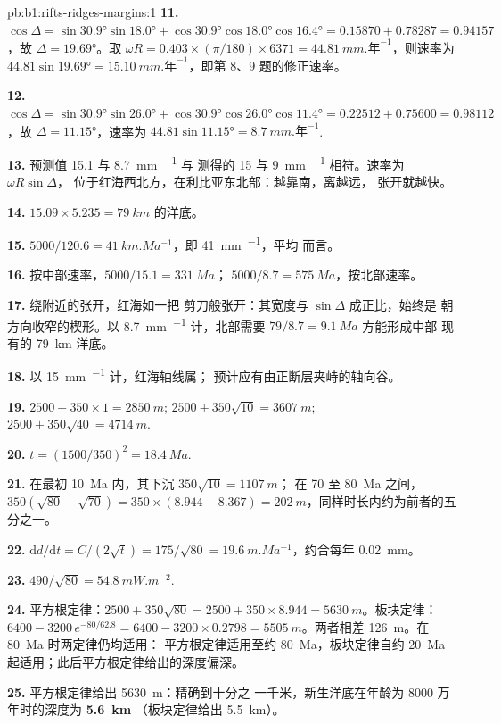 \begin{solution}{pb:b1:rifts-ridges-margins:1}
\textbf{11.} $\cos\Delta = \sin\ang{30.9}\sin\ang{18.0} +
\cos\ang{30.9}\cos\ang{18.0}\cos\ang{16.4} = 0.15870 + 0.78287 = 0.94157$，故
$\Delta = \ang{19.69}$。取 $\omega R = 0.403\times(\pi/180)\times6371 =
\qty{44.81}{mm.\text{年}^{-1}}$，则速率为 $44.81\sin\ang{19.69} =
\qty{15.10}{mm.\text{年}^{-1}}$，即第 8、9 题的修正速率。

\textbf{12.} $\cos\Delta = \sin\ang{30.9}\sin\ang{26.0} +
\cos\ang{30.9}\cos\ang{26.0}\cos\ang{11.4} = 0.22512 + 0.75600 = 0.98112$，故
$\Delta = \ang{11.15}$，速率为 $44.81\sin\ang{11.15} =
\qty{8.7}{mm.\text{年}^{-1}}$.

\textbf{13.} 预测值 15.1 与 \qty{8.7}{mm.^{-1}} 与
测得的 15 与 \qty{9}{mm.^{-1}} 相符。速率为 $\omega R\sin\Delta$，
位于红海西北方，在利比亚东北部：越靠南，离越远，
张开就越快。

\textbf{14.} $15.09\times5.235 = \qty{79}{km}$ 的洋底。

\textbf{15.} $5000/120.6 = \qty{41}{km.Ma^{-1}}$，即 \qty{41}{mm.^{-1}}，平均
而言。

\textbf{16.} 按中部速率，$5000/15.1 = \qty{331}{Ma}$；
$5000/8.7 = \qty{575}{Ma}$，按北部速率。

\textbf{17.} 绕附近的张开，红海如一把
剪刀般张开：其宽度与 $\sin\Delta$ 成正比，始终是
朝方向收窄的楔形。以 \qty{8.7}{mm.^{-1}} 计，北部需要
$79/8.7 = \qty{9.1}{Ma}$ 方能形成中部
现有的 \qty{79}{km} 洋底。

\textbf{18.} 以 \qty{15}{mm.^{-1}} 计，红海轴线属；
预计应有由正断层夹峙的轴向谷。

\textbf{19.} $2500 + 350\times1 = \qty{2850}{m}$;
$2500 + 350\sqrt{10} = \qty{3607}{m}$; $2500 + 350\sqrt{40} = \qty{4714}{m}$.

\textbf{20.} $t = (1500/350)^2 = \qty{18.4}{Ma}$.

\textbf{21.} 在最初 \qty{10}{Ma} 内，其下沉 $350\sqrt{10} = \qty{1107}{m}$；
在 70 至 \qty{80}{Ma} 之间，$350(\sqrt{80} - \sqrt{70}) = 350\times(8.944 -
8.367) = \qty{202}{m}$，同样时长内约为前者的五分之一。

\textbf{22.} $\mathrm dd/\mathrm dt = C/(2\sqrt t) = 175/\sqrt{80} =
\qty{19.6}{m.Ma^{-1}}$，约合每年 \qty{0.02}{mm}。

\textbf{23.} $490/\sqrt{80} = \qty{54.8}{mW.m^{-2}}$.

\textbf{24.} 平方根定律：$2500 + 350\sqrt{80} = 2500 + 350\times8.944 =
\qty{5630}{m}$。板块定律：$6400 - 3200\,e^{-80/62.8} = 6400 - 3200\times0.2798
= \qty{5505}{m}$。两者相差 \qty{126}{m}。在 \qty{80}{Ma} 时两定律仍均适用：
平方根定律适用至约 \qty{80}{Ma}，板块定律自约
\qty{20}{Ma} 起适用；此后平方根定律给出的深度偏深。

\textbf{25.} 平方根定律给出 \qty{5630}{m}：精确到十分之
一千米，新生洋底在年龄为
8000 万年时的深度为 \textbf{\qty[text-series-to-math=true]{5.6}{km}}
（板块定律给出 \qty{5.5}{km}）。
\end{solution}
